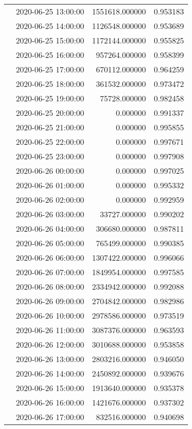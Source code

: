 \begin{tabular}{llrr}
 & 2020-06-25 13:00:00 & 1551618.000000 & 0.953183 \\
 & 2020-06-25 14:00:00 & 1126548.000000 & 0.953689 \\
 & 2020-06-25 15:00:00 & 1172144.000000 & 0.955825 \\
 & 2020-06-25 16:00:00 & 957264.000000 & 0.958399 \\
 & 2020-06-25 17:00:00 & 670112.000000 & 0.964259 \\
 & 2020-06-25 18:00:00 & 361532.000000 & 0.973472 \\
 & 2020-06-25 19:00:00 & 75728.000000 & 0.982458 \\
 & 2020-06-25 20:00:00 & 0.000000 & 0.991337 \\
 & 2020-06-25 21:00:00 & 0.000000 & 0.995855 \\
 & 2020-06-25 22:00:00 & 0.000000 & 0.997671 \\
 & 2020-06-25 23:00:00 & 0.000000 & 0.997908 \\
 & 2020-06-26 00:00:00 & 0.000000 & 0.997025 \\
 & 2020-06-26 01:00:00 & 0.000000 & 0.995332 \\
 & 2020-06-26 02:00:00 & 0.000000 & 0.992959 \\
 & 2020-06-26 03:00:00 & 33727.000000 & 0.990202 \\
 & 2020-06-26 04:00:00 & 306680.000000 & 0.987811 \\
 & 2020-06-26 05:00:00 & 765499.000000 & 0.990385 \\
 & 2020-06-26 06:00:00 & 1307422.000000 & 0.996066 \\
 & 2020-06-26 07:00:00 & 1849954.000000 & 0.997585 \\
 & 2020-06-26 08:00:00 & 2334942.000000 & 0.992088 \\
 & 2020-06-26 09:00:00 & 2704842.000000 & 0.982986 \\
 & 2020-06-26 10:00:00 & 2978586.000000 & 0.973519 \\
 & 2020-06-26 11:00:00 & 3087376.000000 & 0.963593 \\
 & 2020-06-26 12:00:00 & 3010688.000000 & 0.953858 \\
 & 2020-06-26 13:00:00 & 2803216.000000 & 0.946050 \\
 & 2020-06-26 14:00:00 & 2450892.000000 & 0.939676 \\
 & 2020-06-26 15:00:00 & 1913640.000000 & 0.935378 \\
 & 2020-06-26 16:00:00 & 1421676.000000 & 0.937302 \\
 & 2020-06-26 17:00:00 & 832516.000000 & 0.940698 \\

\end{tabular}

